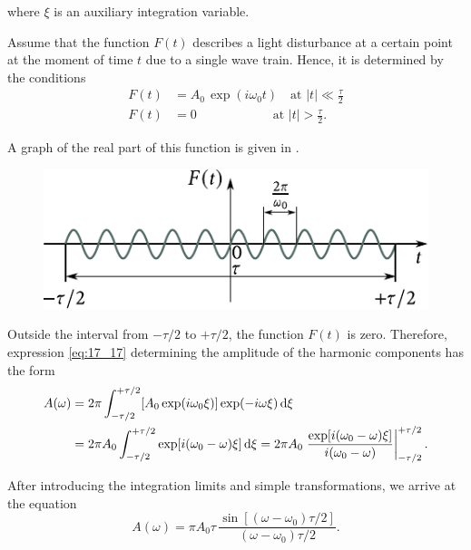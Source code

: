 \noindent
where $\xi$ is an auxiliary integration variable.

Assume that the function $F(t)$ describes a light disturbance at a certain point at the moment of time $t$ due to a single wave train.
Hence, it is determined by the conditions
\begin{align*}
    F(t) &= A_0\, \exp(i \omega_0 t) \quad \text{at } |t| \ll \frac{\tau}{2} \\
    F(t) &= 0 \quad\quad\quad\quad\quad\quad\! \text{at } |t| > \frac{\tau}{2}.
\end{align*}

\noindent
A graph of the real part of this function is given in .

\begin{figure}[t]
	\begin{center}
		\includegraphics[scale=1]{figures/ch_17/fig_17_4.pdf}
		\caption[]{}
		\label{fig:17_4}
	\end{center}
	\vspace{-0.9cm}
\end{figure}

Outside the interval from $-\tau/2$ to $+\tau/2$, the function $F(t)$ is zero.
Therefore, expression \eqref{eq:17_17} determining the amplitude of the harmonic components has the form
\begin{align*}
    A(\omega) &= 2\pi \int_{-\tau/2}^{+\tau/2} [A_0 \exp(i\omega_0\xi)] \exp(-i\omega\xi)\, \mathrm{d}\xi\\
    &= 2\pi A_0 \int_{-\tau/2}^{+\tau/2} \exp[i(\omega_0-\omega)\xi]\, \mathrm{d}\xi = 2\pi A_0 \left.\frac{\exp[i(\omega_0-\omega)\xi]}{i(\omega_0-\omega)}\right|^{+\tau/2}_{-\tau/2}.
\end{align*}

\noindent
After introducing the integration limits and simple transformations, we arrive at the equation
\begin{equation*}
    A(\omega) = \pi A_0 \tau\, \frac{\sin[(\omega-\omega_0)\tau/2]}{(\omega-\omega_0)\tau/2}.
\end{equation*}


